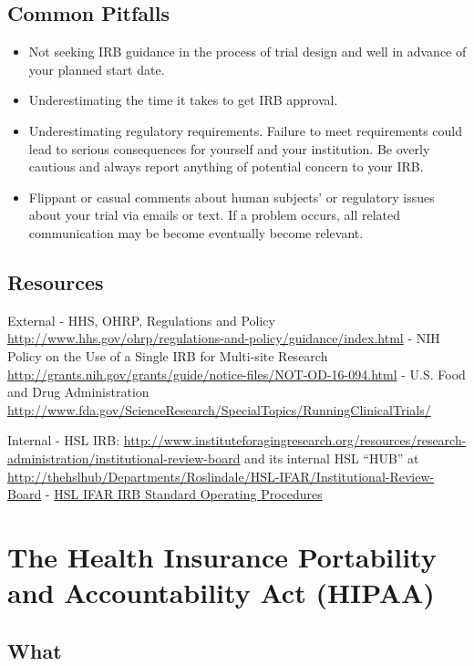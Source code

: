 \documentclass[]{book}
\providecommand{\tightlist}{%
  \setlength{\itemsep}{0pt}\setlength{\parskip}{0pt}}
\begin{document}
\subsection{Common Pitfalls}\label{common-pitfalls-3}

\begin{itemize}
\tightlist
\item
  Not seeking IRB guidance in the process of trial design and well in
  advance of your planned start date.
\item
  Underestimating the time it takes to get IRB approval.
\item
  Underestimating regulatory requirements. Failure to meet requirements
  could lead to serious consequences for yourself and your institution.
  Be overly cautious and always report anything of potential concern to
  your IRB.
\item
  Flippant or casual comments about human subjects' or regulatory issues
  about your trial via emails or text. If a problem occurs, all related
  communication may be become eventually become relevant.
\end{itemize}

\subsection{Resources}\label{resources-4}

External - HHS, OHRP, Regulations and Policy
\url{http://www.hhs.gov/ohrp/regulations-and-policy/guidance/index.html}
- NIH Policy on the Use of a Single IRB for Multi-site Research
\url{http://grants.nih.gov/grants/guide/notice-files/NOT-OD-16-094.html}
- U.S. Food and Drug Administration
\url{http://www.fda.gov/ScienceResearch/SpecialTopics/RunningClinicalTrials/}

Internal - HSL IRB:
\url{http://www.instituteforagingresearch.org/resources/research-administration/institutional-review-board}
and its internal HSL ``HUB'' at
\url{http://thehslhub/Departments/Roslindale/HSL-IFAR/Institutional-Review-Board}
- \href{http://thehslhub/~/media/HSLNet/Docs/IFAR/IRB/IRB_SOP.ashx}{HSL
IFAR IRB Standard Operating Procedures}

\section{The Health Insurance Portability and Accountability Act
(HIPAA)}\label{the-health-insurance-portability-and-accountability-act-hipaa}

\subsection{What}\label{what-6}
\end{document}
